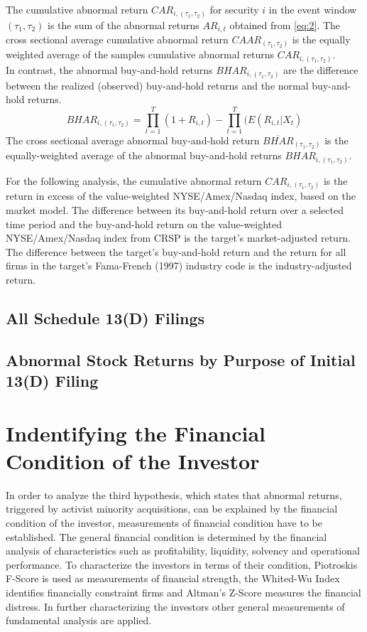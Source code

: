 \documentclass[12pt]{article}
\begin{document}
The cumulative abnormal return $CAR_{i,(\tau_1,\tau_2)}$ for security $i$ in the event window $(\tau_1,\tau_2)$ is the sum of the abnormal returns $AR_{i,t}$ obtained from \eqref{eq:2}. The cross sectional average cumulative abnormal return $CAAR_{(\tau_1,\tau_2)}$ is the equally weighted average of the samples cumulative abnormal returns $CAR_{i,(\tau_1,\tau_2)}$.\\
In contrast, the abnormal buy-and-hold returns $BHAR_{i,(\tau_1,\tau_2)}$ are the difference between the realized (observed) buy-and-hold returns and the normal buy-and-hold returns.
\begin{equation}
	BHAR_{i,(\tau_1,\tau_2)}=\prod_{t=1}^{T}(1+R_{i,t})-\prod_{t=1}^{T}(E(R_{i,t}|X_{t})
\end{equation}
The cross sectional average abnormal buy-and-hold return $\overline{BHAR}_{(\tau_1,\tau_2)}$ is the equally-weighted average of the abnormal buy-and-hold returns $BHAR_{i,(\tau_1,\tau_2)}$.

For the following analysis, the cumulative abnormal return $CAR_{i,(\tau_1,\tau_2)}$ is the return in excess of the value-weighted NYSE/Amex/Nasdaq index, based on the market model. The difference between its buy-and-hold return over a selected time period and the buy-and-hold return on the value-weighted NYSE/Amex/Nasdaq index from CRSP is the target's market-adjusted return. The difference between the target's buy-and-hold return and the return for all firms in the target's Fama-French (1997) industry code is the industry-adjusted return. 

\subsection{All Schedule 13(D) Filings}
\subsection{Abnormal Stock Returns by Purpose of Initial 13(D) Filing}


\section{Indentifying the Financial Condition of the Investor}
In order to analyze the third hypothesis, which states that abnormal returns, triggered by activist minority acquisitions, can be explained by the financial condition of the investor, measurements of financial condition have to be established. The general financial condition is determined by the financial analysis of characteristics such as profitability, liquidity, solvency and operational performance. To characterize the investors in terms of their condition, Piotroskis F-Score is used as measurements of financial strength, the Whited-Wu Index identifies financially constraint firms and Altman's Z-Score measures the financial distress. In further characterizing the investors other general measurements of fundamental analysis are applied. 
\end{document}
